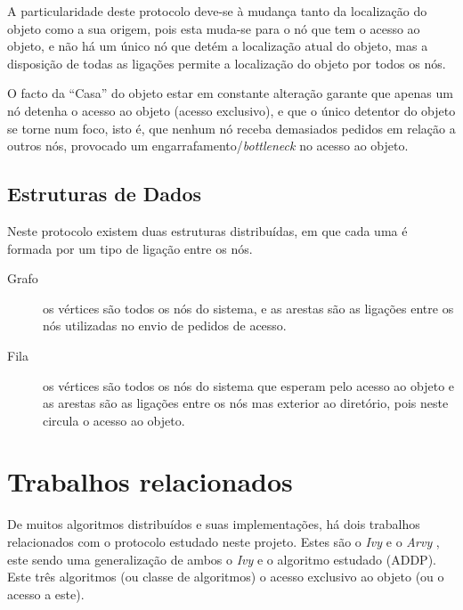  

A particularidade deste protocolo deve-se à mudança tanto da localização do objeto como a sua origem, pois esta muda-se para o nó que tem o acesso ao objeto, e não há um único nó que detém a localização atual do objeto, mas a disposição de todas as ligações permite a localização do objeto por todos os nós.

O facto da ``Casa'' do objeto estar em constante alteração garante que apenas um nó detenha o acesso ao objeto (acesso exclusivo), e que o único detentor do objeto se torne num foco, isto é, que nenhum nó receba demasiados pedidos em relação a outros nós, provocado um engarrafamento/\emph{bottleneck} no acesso ao objeto.


\subsection*{Estruturas de Dados}
Neste protocolo existem duas estruturas distribuídas, em que cada uma é formada por um tipo de ligação entre os nós.

\begin{description} 
    \item [Grafo] os vértices são todos os nós do sistema, e as arestas são as ligações entre os nós utilizadas no envio de pedidos de acesso.
    \item [Fila] os vértices são todos os nós do sistema que esperam pelo acesso ao objeto  e as arestas são as ligações entre os nós mas exterior ao diretório, pois neste circula o acesso ao objeto.
\end{description}

\section{Trabalhos relacionados}
\label{motivacao:sec:trabalhos_relacionados}

De muitos algoritmos distribuídos e suas implementações, há dois trabalhos relacionados com o protocolo estudado neste projeto. Estes são o \emph{Ivy} \cite{Ivy} e o \emph{Arvy} \cite{Arvy}, este sendo uma generalização de ambos o \emph{Ivy} e o algoritmo estudado (\acs{ADDP}). Este três algoritmos (ou classe de algoritmos) o acesso exclusivo ao objeto (ou o acesso a este).


